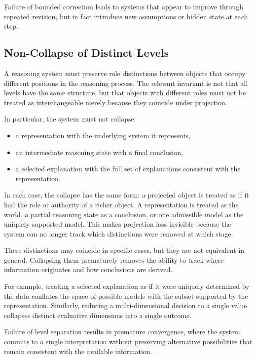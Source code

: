 \documentclass[11pt]{article}
\begin{document}
Failure of bounded correction leads to systems that appear to improve through repeated revision, but in fact introduce new assumptions or hidden state at each step.

\subsection{Non-Collapse of Distinct Levels}

A reasoning system must preserve role distinctions between objects that occupy different positions in the reasoning process. The relevant invariant is not that all levels have the same structure, but that objects with different roles must not be treated as interchangeable merely because they coincide under projection.

In particular, the system must not collapse:
\begin{itemize}[leftmargin=1.5em]
    \item a representation with the underlying system it represents,
    \item an intermediate reasoning state with a final conclusion,
    \item a selected explanation with the full set of explanations consistent with the representation.
\end{itemize}

In each case, the collapse has the same form: a projected object is treated as if it had the role or authority of a richer object. A representation is treated as the world, a partial reasoning state as a conclusion, or one admissible model as the uniquely supported model. This makes projection loss invisible because the system can no longer track which distinctions were removed at which stage.

These distinctions may coincide in specific cases, but they are not equivalent in general. Collapsing them prematurely removes the ability to track where information originates and how conclusions are derived.

For example, treating a selected explanation as if it were uniquely determined by the data conflates the space of possible models with the subset supported by the representation. Similarly, reducing a multi-dimensional decision to a single value collapses distinct evaluative dimensions into a single outcome.

Failure of level separation results in premature convergence, where the system commits to a single interpretation without preserving alternative possibilities that remain consistent with the available information.
\end{document}
